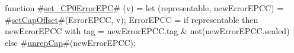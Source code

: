 function #\hyperref[zsetzyCP0ErrorEPC]{set\_CP0ErrorEPC}# (v) = {
  let (representable, newErrorEPCC) = #\hyperref[zsetCapOffset]{setCapOffset}#(ErrorEPCC, v);
  ErrorEPCC = if representable then
      {newErrorEPCC with tag = newErrorEPCC.tag & not(newErrorEPCC.sealed)}
    else
      #\hyperref[zunrepCap]{unrepCap}#(newErrorEPCC);
}
